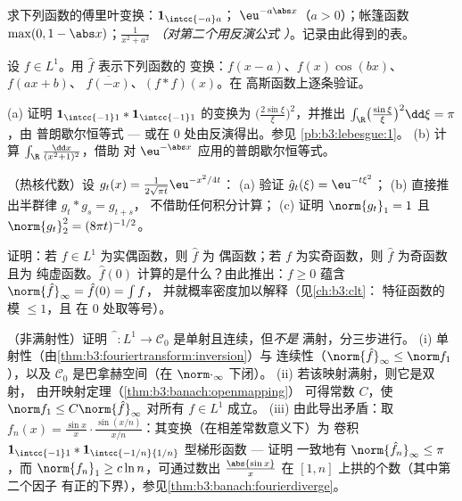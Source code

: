 \begin{exercise}[$\star$]\label{exo:b3:fouriertransform:1}
求下列函数的傅里叶变换：$\mathbf 1_{\intcc{-a}a}$；
$\eu^{-a\abs x}$（$a > 0$）；帐篷函数 $\max(0, 1 -
\abs x)$；$\frac1{x^2 + a^2}$ \emph{（对第二个用反演公式
）}。记录由此得到的表。
\end{exercise}

\begin{exercise}[$\star$]\label{exo:b3:fouriertransform:2}
设 $f \in L^1$。用 $\hat f$ 表示下列函数的
变换：$f(x - a)$、$f(x)\cos(bx)$、$f(ax + b)$、
$\overline{f(-x)}$、$(f * f)(x)$。在
高斯函数上逐条验证。
\end{exercise}

\begin{exercise}[$\star\star$]\label{exo:b3:fouriertransform:3}
(a) 证明 $\mathbf 1_{\intcc{-1}1} * \mathbf
1_{\intcc{-1}1}$ 的变换为 $\bigl(\frac{2\sin\xi}\xi
\bigr)^2$，并推出
$\int_\R\bigl(\frac{\sin\xi}\xi\bigr)^2\dd\xi = \pi$，由
普朗歇尔恒等式 --- 或在 $0$ 处由反演得出。参见
\cref{pb:b3:lebesgue:1}。
(b) 计算 $\int_\R\frac{\dd x}{(x^2+1)^2}$，借助
对 $\eu^{-\abs x}$ 应用的普朗歇尔恒等式。
\end{exercise}

\begin{exercise}[$\star\star$]\label{exo:b3:fouriertransform:4}
（热核代数）设 $g_t(x) =
\frac1{2\sqrt{\pi t}}\eu^{-x^2/4t}$：
(a) 验证 $\hat g_t(\xi) = \eu^{-t\xi^2}$；
(b) 直接推出半群律 $g_t * g_s = g_{t+s}$，
不借助任何积分计算；
(c) 证明 $\norm{g_t}_1 = 1$ 且 $\norm{g_t}_2^2 =
(8\pi t)^{-1/2}$。
\end{exercise}

\begin{exercise}[$\star\star$]\label{exo:b3:fouriertransform:5}
证明：若 $f \in L^1$ 为实偶函数，则 $\hat f$ 为
偶函数；若 $f$ 为实奇函数，则 $\hat f$ 为奇函数且为
纯虚函数。$\hat f(0)$ 计算的是什么？由此推出：$f \geq
0$ 蕴含 $\norm{\hat f}_\infty = \hat f(0) = \int f$，
并就概率密度加以解释（见\cref{ch:b3:clt}：
特征函数的模 $\leq 1$，且
在 $0$ 处取等号）。
\end{exercise}

\begin{exercise}[$\star\star\star$]\label{exo:b3:fouriertransform:6}
（非满射性）证明 $\widehat{\phantom f}\colon L^1
\to \mathcal C_0$ 是单射且连续，但\emph{不是}
满射，分三步进行。
(i) 单射性（由\cref{thm:b3:fouriertransform:inversion}）与
连续性（$\norm{\hat f}_\infty \leq \norm f_1$），以及
$\mathcal C_0$ 是巴拿赫空间（在
$\norm\cdot_\infty$ 下闭）。
(ii) 若该映射满射，则它是双射，
由开映射定理（\cref{thm:b3:banach:openmapping}）
可得常数 $C$，使 $\norm f_1 \leq C\norm{\hat
f}_\infty$ 对所有 $f \in L^1$ 成立。
(iii) 由此导出矛盾：取 $f_n(x) = \frac{\sin
x}{x}\cdot\frac{\sin(x/n)}{x/n}$：其变换（在相差常数意义下）为
卷积 $\mathbf 1_{\intcc{-1}1} *
\mathbf 1_{\intcc{-1/n}{1/n}}$ 型梯形函数 --- 证明
一致地有 $\norm{\hat f_n}_\infty \leq \pi$，而
$\norm{f_n}_1 \geq c\ln n$，可通过数出
$\frac{\abs{\sin x}}x$ 在 $[1, n]$ 上拱的个数（其中第二个因子
有正的下界），参见\cref{thm:b3:banach:fourierdiverge}。
\end{exercise}

